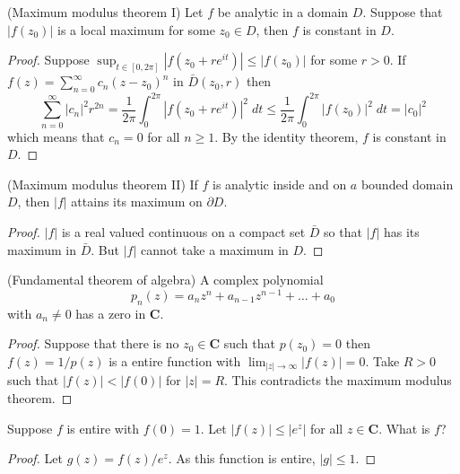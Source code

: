 \vspace{2ex}
\begin{thm}
(Maximum modulus theorem I) Let $f$ be analytic in a domain $D$. Suppose that $|f(z_0)|$ is a local maximum for some $z_0\in D$, then $f$ is constant in $D$. 
\end{thm}
\vspace{2ex}
\begin{proof}
Suppose $\sup _{t\in [0,2\pi ]}|f(z_0+re^{it})|\leq |f(z_0)|$ for some $r>0$. If $f(z)=\sum ^{\infty }_{n=0}c_{n}(z-z_0)^{n}$ in $\bar{D}(z_0,r)$ then
\[\sum ^{\infty }_{n=0}|c_{n}|^2r^{2n}=\dfrac{1}{2\pi }\int ^{2\pi }_{0}|f(z_0+re^{it})|^2\;dt\leq \dfrac{1}{2\pi }\int^{2\pi }_{0}|f(z_0)|^2\;dt=|c_0|^2\]
which means that $c_{n}=0$ for all $n\geq 1$. By the identity theorem, $f$ is constant in $D$. 
\end{proof}
\vspace{2ex}
\begin{thm}
(Maximum modulus theorem II) If $f$ is analytic inside and on $a$ bounded domain $D$, then $|f|$ attains its maximum on $\partial D$. 
\end{thm}
\vspace{2ex}
\begin{proof}
$|f|$ is a real valued continuous on a compact set $\bar{D}$ so that $|f|$ has its maximum in $\bar{D}$. But $|f|$ cannot take a maximum in $D$. 
\end{proof}
\vspace{2ex}
\begin{thm}
(Fundamental theorem of algebra) A complex polynomial
\[p_{n}(z)=a_{n}z^{n}+a_{n-1}z^{n-1}+\ldots +a_0\]
with $a_{n}\ne 0$ has a zero in ${\bm C}$.
\end{thm}
\vspace{2ex}
\begin{proof}
Suppose that there is no $z_0\in {\bm C}$ such that $p(z_0)= 0$ then $f(z)=1/p(z)$ is a entire function with $\lim _{|z|\rightarrow \infty }|f(z)|=0$. Take $R>0$ such that $|f(z)|<|f(0)|$ for $|z|=R$. This contradicts the maximum modulus theorem. 
\end{proof}
\vspace{2ex}
\begin{ex}
Suppose $f$ is entire with $f(0)=1$. Let $|f(z)|\leq |e^{z}|$ for all $z\in {\bm C}$. What is $f$?
\end{ex}
\vspace{2ex}
\begin{proof}
Let $g(z)=f(z)/e^{z}$. As this function is entire, $|g|\leq 1$. 
\end{proof}
\vspace{2ex}


